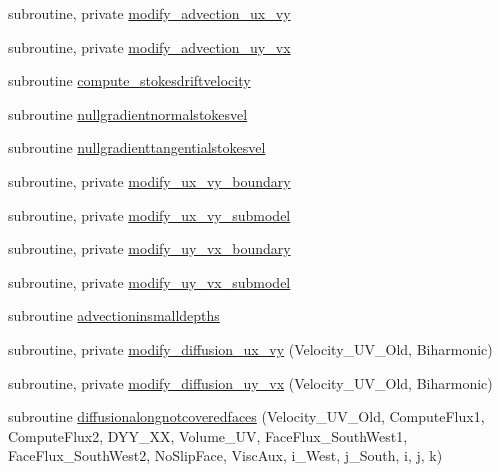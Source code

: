 \begin{DoxyCompactItemize}
\item 
subroutine, private \mbox{\hyperlink{namespacemodulehydrodynamic_af43a9493ede9bd9769c3084aeeb523f8}{modify\+\_\+advection\+\_\+ux\+\_\+vy}}
\item 
subroutine, private \mbox{\hyperlink{namespacemodulehydrodynamic_ac84a050bb84449fb6c44f7788ee3ff4f}{modify\+\_\+advection\+\_\+uy\+\_\+vx}}
\item 
subroutine \mbox{\hyperlink{namespacemodulehydrodynamic_aa9d607cb819115ecbd2eaade1767926c}{compute\+\_\+stokesdriftvelocity}}
\item 
subroutine \mbox{\hyperlink{namespacemodulehydrodynamic_a4ecf50b9477e7ba12adebe7aef0435c9}{nullgradientnormalstokesvel}}
\item 
subroutine \mbox{\hyperlink{namespacemodulehydrodynamic_a0b72f75ffb8470f241904b141a68198e}{nullgradienttangentialstokesvel}}
\item 
subroutine, private \mbox{\hyperlink{namespacemodulehydrodynamic_aa6b040cc956589c18c71f8802c0239ed}{modify\+\_\+ux\+\_\+vy\+\_\+boundary}}
\item 
subroutine, private \mbox{\hyperlink{namespacemodulehydrodynamic_a6396fb9a63198209bc95000bda6ab5fc}{modify\+\_\+ux\+\_\+vy\+\_\+submodel}}
\item 
subroutine, private \mbox{\hyperlink{namespacemodulehydrodynamic_a39fedec790eef204c11688a4105fcfc1}{modify\+\_\+uy\+\_\+vx\+\_\+boundary}}
\item 
subroutine, private \mbox{\hyperlink{namespacemodulehydrodynamic_afcaf5434809b23ffd61b09505bfda4f4}{modify\+\_\+uy\+\_\+vx\+\_\+submodel}}
\item 
subroutine \mbox{\hyperlink{namespacemodulehydrodynamic_afb548a927ee2fd2189deebf674794975}{advectioninsmalldepths}}
\item 
subroutine, private \mbox{\hyperlink{namespacemodulehydrodynamic_a1961c3204e40bc45322afca99ce797ea}{modify\+\_\+diffusion\+\_\+ux\+\_\+vy}} (Velocity\+\_\+\+U\+V\+\_\+\+Old, Biharmonic)
\item 
subroutine, private \mbox{\hyperlink{namespacemodulehydrodynamic_a8bf6e87d87f18ed2725786160a05e8d4}{modify\+\_\+diffusion\+\_\+uy\+\_\+vx}} (Velocity\+\_\+\+U\+V\+\_\+\+Old, Biharmonic)
\item 
subroutine \mbox{\hyperlink{namespacemodulehydrodynamic_ab381daa0e16a21aa8f474a88fc7d11b7}{diffusionalongnotcoveredfaces}} (Velocity\+\_\+\+U\+V\+\_\+\+Old, Compute\+Flux1, Compute\+Flux2, D\+Y\+Y\+\_\+\+XX, Volume\+\_\+\+UV, Face\+Flux\+\_\+\+South\+West1, Face\+Flux\+\_\+\+South\+West2, No\+Slip\+Face, Visc\+Aux, i\+\_\+\+West, j\+\_\+\+South, i, j, k)

\end{DoxyCompactItemize}

